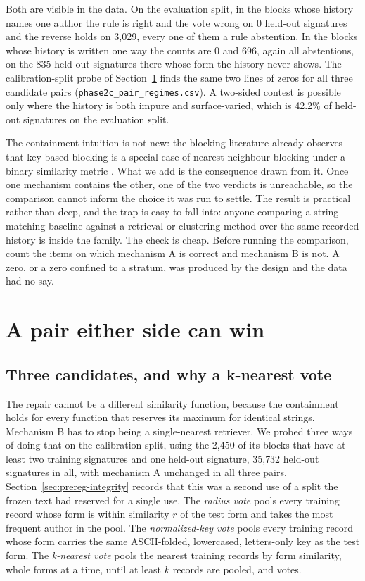 \documentclass[11pt]{article}
\begin{document}
Both are visible in the data. On the evaluation split, in the blocks whose
history names one author the rule is right and the vote wrong on 0 held-out
signatures and the reverse holds on 3{,}029, every one of them a rule
abstention. In the blocks whose history is written one way the counts are 0
and 696, again all abstentions, on the 835 held-out signatures there whose
form the history never shows. The calibration-split probe of
Section~\ref{sec:repaired-pair} finds the same two lines of zeros for all
three candidate pairs (\texttt{phase2c\_pair\_regimes.csv}). A two-sided contest is possible only where the history
is both impure and surface-varied, which is 42.2\% of held-out signatures on
the evaluation split.

The containment intuition is not new: the blocking literature already observes
that key-based blocking is a special case of nearest-neighbour blocking under
a binary similarity metric \citep{autoblock2020}. What we add is the
consequence drawn from it. Once one mechanism contains the other,
one of the two verdicts is unreachable, so the comparison cannot inform the
choice it was run to settle. The result is practical rather than deep, and
the trap is easy to fall into: anyone comparing a string-matching baseline
against a retrieval or clustering method over the same recorded history is
inside the family. The check is cheap. Before running the comparison, count
the items on which mechanism A is correct and mechanism B is not. A zero, or a
zero confined to a stratum, was produced by the design and the data had no
say.

\section{A pair either side can win}
\label{sec:repaired-pair}

\subsection{Three candidates, and why a k-nearest vote}
\label{sec:candidates}

The repair cannot be a different similarity function, because the containment
holds for every function that reserves its maximum for identical strings.
Mechanism B has to stop being a single-nearest
retriever. We probed three ways of doing that on the calibration split, using
the 2{,}450 of its blocks that have at least two training signatures and one
held-out signature, 35{,}732 held-out signatures in all, with mechanism A
unchanged in all three pairs. Section~\ref{sec:prereg-integrity} records that
this was a second use of a split the frozen text had reserved for a single use. The \emph{radius vote} pools every training record whose form
is within similarity $r$ of the test form and takes the most frequent author
in the pool. The \emph{normalized-key vote} pools every training record whose
form carries the same ASCII-folded, lowercased, letters-only key as the test
form. The \emph{k-nearest vote} pools the nearest training records by form
similarity, whole forms at a time, until at least $k$ records are pooled, and
votes.
\end{document}
